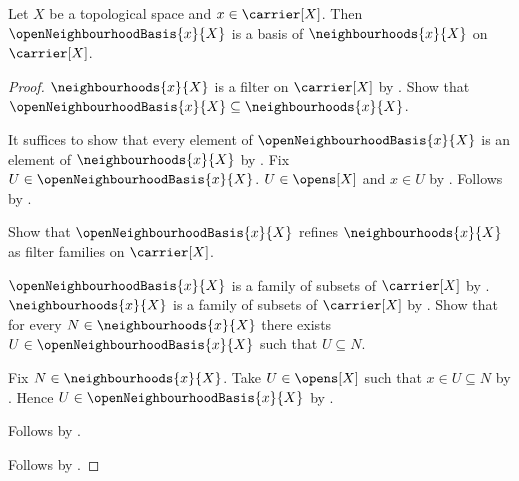 \begin{corollary}\label{open_neighbourhoods_are_neighbourhood_filter_basis}
    Let $X$ be a topological space and $x\in\carrier[X]$.
    Then $\openNeighbourhoodBasis{x}{X}$ is a basis of
        $\neighbourhoods{x}{X}$ on $\carrier[X]$.
\end{corollary}
\begin{proof}
    $\neighbourhoods{x}{X}$ is a filter on $\carrier[X]$ by
        .
    Show that $\openNeighbourhoodBasis{x}{X}
        \subseteq\neighbourhoods{x}{X}$.
    \begin{subproof}
        It suffices to show that every element of
            $\openNeighbourhoodBasis{x}{X}$ is an element of
            $\neighbourhoods{x}{X}$ by .
        Fix $U\in\openNeighbourhoodBasis{x}{X}$.
        $U\in\opens[X]$ and $x\in U$ by
            .
        Follows by .
    \end{subproof}
    Show that $\openNeighbourhoodBasis{x}{X}$ refines
        $\neighbourhoods{x}{X}$ as filter families on $\carrier[X]$.
    \begin{subproof}
        $\openNeighbourhoodBasis{x}{X}$ is a family of subsets of
            $\carrier[X]$ by .
        $\neighbourhoods{x}{X}$ is a family of subsets of $\carrier[X]$
            by .
        Show that for every $N\in\neighbourhoods{x}{X}$ there exists
            $U\in\openNeighbourhoodBasis{x}{X}$ such that $U\subseteq N$.
        \begin{subproof}
            Fix $N\in\neighbourhoods{x}{X}$.
            Take $U\in\opens[X]$ such that $x\in U\subseteq N$ by
                .
            Hence $U\in\openNeighbourhoodBasis{x}{X}$ by
                .
        \end{subproof}
        Follows by .
    \end{subproof}
    Follows by .
\end{proof}

